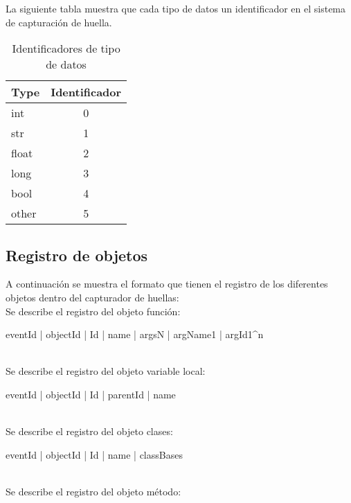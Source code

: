 \documentclass[10pt,a4paper]{article}
\begin{document}
La siguiente tabla muestra que cada tipo de datos un identificador en el sistema de capturación de huella.
\begin{table}[h]
\begin{center}
\begin{tabular}{|l | c |}
\hline
Type & Identificador\\
\hline
int & 0\\
\hline
str & 1\\
\hline
float & 2\\
\hline
long & 3\\
\hline
bool & 4\\
\hline
other & 5\\
\hline
\end{tabular}
\caption{Identificadores de tipo de datos} 
\end{center}
\end{table}

\subsection{Registro de objetos}

A continuación se muestra el formato que tienen el registro de los diferentes objetos dentro del capturador de huellas:\\

Se describe el registro del objeto función:\\

\begin{boxedverbatim}
eventId | objectId | Id | name | argsN | {argName1 | argId1}^n
\end{boxedverbatim}
\\

Se describe el registro del objeto variable local:\\

\begin{boxedverbatim}
eventId | objectId | Id | parentId | name
\end{boxedverbatim}
\\

Se describe el registro del objeto clases:\\

\begin{boxedverbatim}
eventId | objectId | Id | name | classBases
\end{boxedverbatim}
\\

Se describe el registro del objeto método:\\
\end{document}
